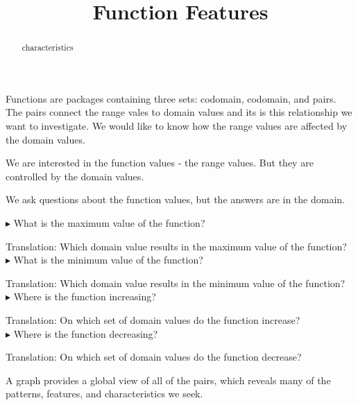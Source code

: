 \documentclass{ximera}
\title{Function Features}
\begin{document}
\begin{abstract}
characteristics
\end{abstract}
\maketitle





Functions are packages containing three sets: codomain, codomain, and pairs.  The pairs connect the range vales to domain values and its is this relationship we want to investigate.   We would like to know how the range values are affected by the domain values. 

We are interested in the function values - the range values.  But they are controlled by the domain values.

We ask questions about the function values, but the answers are in the domain.





\begin{idea}


$\blacktriangleright$ What is the maximum value of the function? 

Translation: Which domain value results in the maximum value of the function? \\


$\blacktriangleright$ What is the minimum value of the function? 

Translation: Which domain value results in the minimum value of the function? \\


$\blacktriangleright$ Where is the function increasing? 

Translation: On which set of domain values do the function increase? \\


$\blacktriangleright$ Where is the function decreasing? 

Translation: On which set of domain values do the function decrease? \\


\end{idea}








A graph provides a global view of all of the pairs, which reveals many of the patterns, features, and characteristics we seek.   
\end{document}
